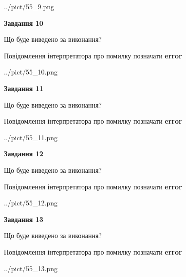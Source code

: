 \documentclass[11pt, ukrainian]{article}
\begin{document}
{\begin {large}
\begin{center}
	{../pict/55_9.png}
\end{center}
\newpage

{\begin {center}\textbf{Завдання 10}\end {center}}\par
Що буде виведено за виконання? \par
Повідомлення інтерпретатора про помилку позначати \textbf{error}

\begin{center}
	{../pict/55_10.png}
\end{center}
\newpage

{\begin {center}\textbf{Завдання 11}\end {center}}\par
Що буде виведено за виконання? \par
Повідомлення інтерпретатора про помилку позначати \textbf{error}

\begin{center}
	{../pict/55_11.png}
\end{center}
\newpage

{\begin {center}\textbf{Завдання 12}\end {center}}\par
Що буде виведено за виконання? \par
Повідомлення інтерпретатора про помилку позначати \textbf{error}

\begin{center}
	{../pict/55_12.png}
\end{center}
\newpage

{\begin {center}\textbf{Завдання 13}\end {center}}\par
Що буде виведено за виконання? \par
Повідомлення інтерпретатора про помилку позначати \textbf{error}

\begin{center}
	{../pict/55_13.png}
\end{center}
\newpage


\end{large}}
\end{document}
